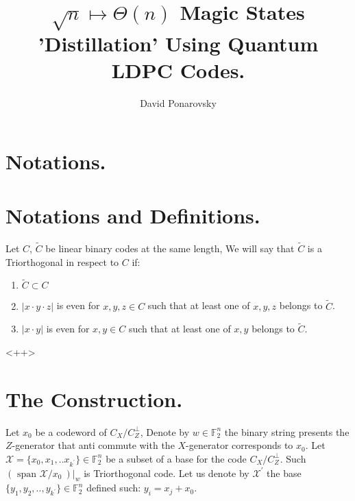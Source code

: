 \documentclass[manuscript,screen,review]{acmart}
\begin{document}

\title{ $\sqrt{n} \mapsto \Theta(n)$  Magic States 'Distillation' Using
Quantum LDPC Codes. }
\author{David Ponarovsky}
\maketitle

\newcommand*{\Mbas}{\mathcal{X}^\prime}
\newcommand*{\sMbas}{\text{span }\Mbas}
\newcommand*{\QQ}{C_{X}/C_{Z}^\perp }
\newcommand*{\trig}{Triorthogonal }
\newcommand*{\Hyp}{Hyperproduct }
\newcommand*{\Cin}{ C_{\text{initial}} }
\newcommand*{\Ctan}{ C_{\text{Tanner}} }

\section{Notations.}

\section{Notations and Definitions.}

\begin{definition}
  Let $C$, $\tilde{C}$ be linear binary codes at the same length, We will say that $\tilde{C}$ is a \trig in respect to $C$ if: 
  \begin{enumerate}
    \item $\tilde{C} \subset C$
    \item $|x\cdot y \cdot z|$ is even for $x,y,z \in C$ such that at least one of $x,y,z$  belongs to $\tilde{C}$. 
    \item $|x\cdot y|$ is even for $x,y \in C$ such that at least one of $x,y$  belongs to $\tilde{C}$. 
  \end{enumerate}<++>
\end{definition}

\section{The Construction.}

Let $x_{0}$ be a codeword of $\QQ$,  Denote by $w \in \mathbb{F}_{2}^{n}$
the binary string presents the $Z$-generator that anti commute with the
$X$-generator corresponds to $x_{0}$. Let $\mathcal{X} = \{x_{0}, x_{1}, .. x_{k^\prime}\} \in \mathbb{F}_{2}^{n}$ be a
subset of a base for the code $\QQ$. Such $\left(\text{ span } \mathcal{X}/x_0 \ \right)|_{w}$ is \trig code.  
Let us denote by $\Mbas$ the base $\{ y_{1}, y_{2}, .., y_{k^\prime} \} \in
\mathbb{F}_{2}^{n}$ defined such: $ y_{i} = x_{j} + x_{0}$. 
\end{document}
